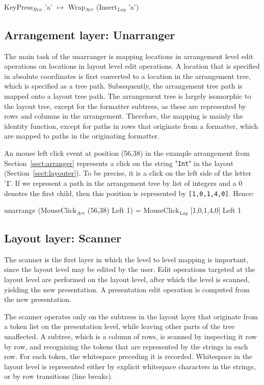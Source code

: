 \ttfamily
KeyPress$_{Ren}$ 'a' $\mapsto$ Wrap$_{Arr}$ (Insert$_{Lay}$ 'a')
\rmfamily

\subsection{Arrangement layer: Unarranger}

The main task of the unarranger is mapping locations in arrangement level edit operations on locations in layout level edit operations. A location that is specified in absolute coordinates is first converted to a location in the arrangement tree, which is specified as a tree path. Subsequently, the arrangement tree path is mapped onto a layout tree path. The arrangement tree is largely isomorphic to the layout tree, except for the formatter subtrees, as these are represented by rows and columns in the arrangement. Therefore, the mapping is mainly the identity function, except for paths in rows that originate from a formatter, which are mapped to paths in the originating formatter.

An mouse left click event at position (56,38) in the example arrangement from Section~\ref{sect:arranger} represents a click on the string "\verb|Int|" in the layout (Section~\ref{sect:layouter}). To be precise, it is a click on the left side of the letter '\verb|I|'. If we represent a path in the arrangement tree by list of integers and a 0 denotes the first child, then this position is represented by \verb|[1,0,1,4,0]|.  Hence:

\ttfamily
unarrange (MouseClick$_{Arr}$ (56,38) Left 1) = MouseClick$_{Lay}$ [1,0,1,4,0] Left 1
\rmfamily

\subsection{Layout layer: Scanner} \label{sect:scanner}

The scanner is the first layer in which the level to level mapping is important, since the layout level may be edited by the user. Edit operations targeted at the layout level are performed on the layout level, after which the level is scanned, yielding the new presentation. A presentation edit operation is computed from the new presentation.

The scanner operates only on the subtrees in the layout layer that originate from a token list on the presentation level, while leaving other parts of the tree unaffected. A subtree, which is a column of rows, is scanned by inspecting it row by row, and recognizing the tokens that are represented by the strings in each row. For each token, the whitespace preceding it is recorded. Whitespace in the layout level is represented either by explicit whitespace characters in the strings, or by row transitions (line breaks).   

